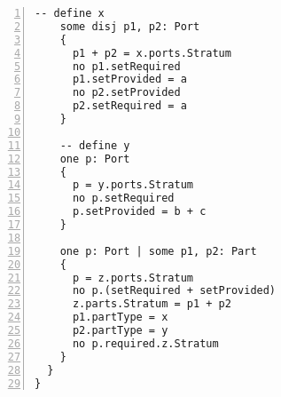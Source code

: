 \begin{lstlisting}[caption={unittests\_inference.als}, numbers=left]
    -- define x
    some disj p1, p2: Port
    {
      p1 + p2 = x.ports.Stratum
      no p1.setRequired
      p1.setProvided = a
      no p2.setProvided
      p2.setRequired = a
    }
    
    -- define y
    one p: Port
    {
      p = y.ports.Stratum
      no p.setRequired
      p.setProvided = b + c
    }
    
    one p: Port | some p1, p2: Part
    {
      p = z.ports.Stratum
      no p.(setRequired + setProvided)
      z.parts.Stratum = p1 + p2
      p1.partType = x
      p2.partType = y
      no p.required.z.Stratum
    }
  }
}
\end{lstlisting}

